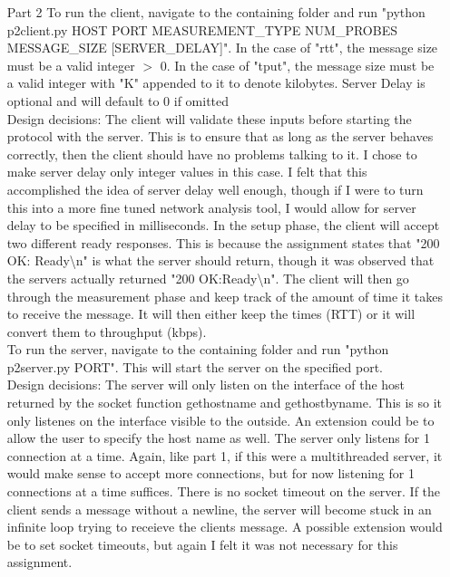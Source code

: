 \documentclass[11pt]{article}
\theoremstyle{definition}
\begin{document}
\begin{enumerate}
\item[Part 2]
To run the client, navigate to the containing folder and run "python p2client.py HOST PORT MEASUREMENT\_TYPE NUM\_PROBES MESSAGE\_SIZE [SERVER\_DELAY]".  In the case of "rtt", the message size must be a valid integer $>$ 0.  In the case of "tput", the message size must be a valid integer with "K" appended to it to denote kilobytes.  Server Delay is optional and will default to 0 if omitted\\
\newline
Design decisions: The client will validate these inputs before starting the protocol with the server.  This is to ensure that as long as the server behaves correctly, then the client should have no problems talking to it.  I chose to make server delay only integer values in this case.  I felt that this accomplished the idea of server delay well enough, though if I were to turn this into a more fine tuned network analysis tool, I would allow for server delay to be specified in milliseconds.  In the setup phase, the client will accept two different ready responses.  This is because the assignment states that "200 OK: Ready\textbackslash n" is what the server should return, though it was observed that the servers actually returned "200 OK:Ready\textbackslash n".  The client will then go through the measurement phase and keep track of the amount of time it takes to receive the message.  It will then either keep the times (RTT) or it will convert them to throughput (kbps). \\
\newline
To run the server, navigate to the containing folder and run "python p2server.py PORT".  This will start the server on the specified port.\\
\newline
Design decisions: The server will only listen on the interface of the host returned by the socket function gethostname and gethostbyname.  This is so it only listenes on the interface visible to the outside.  An extension could be to allow the user to specify the host name as well.  The server only listens for 1 connection at a time.  Again, like part 1, if this were a multithreaded server, it would make sense to accept more connections, but for now listening for 1 connections at a time suffices.  There is no socket timeout on the server.  If the client sends a message without a newline, the server will become stuck in an infinite loop trying to receieve the clients message.  A possible extension would be to set socket timeouts, but again I felt it was not necessary for this assignment.

\end{enumerate}
\end{document}
